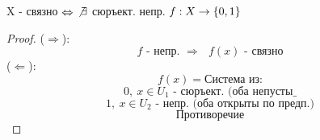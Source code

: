 \documentclass[geometry.tex]{subfiles}
\begin{document}
  \begin{consequence}
      X - связно $\Leftrightarrow$ $\not \exists$ сюръект. непр. $f: X \rightarrow \{0,1\}$
  \end{consequence}

  \begin{proof}
      ($\Rightarrow$):
\[\text{$f$ - непр. $\Rightarrow$ $f(x)$ - связно}\]
      ($\Leftarrow$):
\[f(x) = \text{Система из:}\]
              \[0,\ x \in U_1 \text{ - сюръект. (оба непусты_}\]
              \[1,\ x \in U_2 \text{ - непр. (оба открыты по предп.)}\]
\[\text{Противоречие}\]
  \end{proof}
\end{document}
